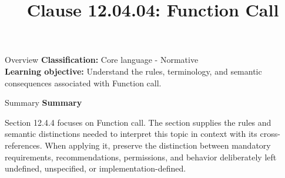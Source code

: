 \documentclass[10pt,letterpaper]{article}
\title{Clause 12.04.04: Function Call}
\author{}
\date{}
\begin{document}
\maketitle
\begin{CornellOverviewBox}{Overview}
\textbf{Classification:} Core language - Normative\\[2pt]
\textbf{Learning objective:} Understand the rules, terminology, and semantic consequences associated with Function call.
\end{CornellOverviewBox}\begin{CornellSummaryBox}{Summary}
{\sffamily\bfseries\color{Accent} Summary}\par\vspace{3pt}Section 12.4.4 focuses on Function call. The section supplies the rules and semantic distinctions needed to interpret this topic in context with its cross-references. When applying it, preserve the distinction between mandatory requirements, recommendations, permissions, and behavior deliberately left undefined, unspecified, or implementation-defined.
\end{CornellSummaryBox}
\end{document}
